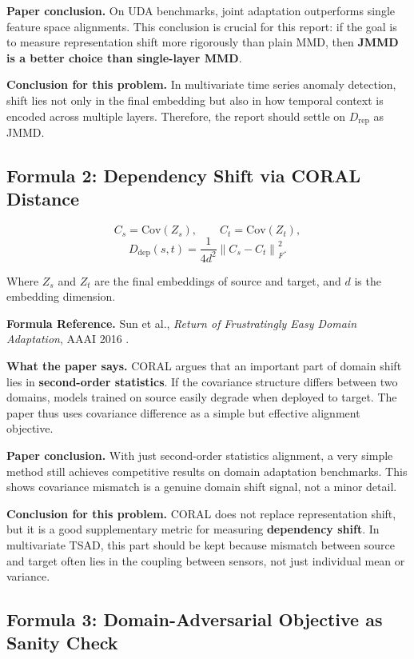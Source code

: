 \documentclass[a4paper]{article}
\begin{document}
\textbf{Paper conclusion.} On UDA benchmarks, joint adaptation outperforms single feature space alignments. This conclusion is crucial for this report: if the goal is to measure representation shift more rigorously than plain MMD, then \textbf{JMMD is a better choice than single-layer MMD}.

\textbf{Conclusion for this problem.} In multivariate time series anomaly detection, shift lies not only in the final embedding but also in how temporal context is encoded across multiple layers. Therefore, the report should settle on \(D_{\mathrm{rep}}\) as JMMD.

\subsection{Formula 2: Dependency Shift via CORAL Distance}

\[
C_s = \mathrm{Cov}(Z_s),
\qquad
C_t = \mathrm{Cov}(Z_t),
\]
\[
D_{\mathrm{dep}}(s,t) = \frac{1}{4d^2}\left\| C_s - C_t \right\|_F^2.
\]

Where \(Z_s\) and \(Z_t\) are the final embeddings of source and target, and \(d\) is the embedding dimension.

\textbf{Formula Reference.} Sun et al., \emph{Return of Frustratingly Easy Domain Adaptation}, AAAI 2016 \cite{coral}.

\textbf{What the paper says.} CORAL argues that an important part of domain shift lies in \textbf{second-order statistics}. If the covariance structure differs between two domains, models trained on source easily degrade when deployed to target. The paper thus uses covariance difference as a simple but effective alignment objective.

\textbf{Paper conclusion.} With just second-order statistics alignment, a very simple method still achieves competitive results on domain adaptation benchmarks. This shows covariance mismatch is a genuine domain shift signal, not a minor detail.

\textbf{Conclusion for this problem.} CORAL does not replace representation shift, but it is a good supplementary metric for measuring \textbf{dependency shift}. In multivariate TSAD, this part should be kept because mismatch between source and target often lies in the coupling between sensors, not just individual mean or variance.

\subsection{Formula 3: Domain-Adversarial Objective as Sanity Check}
\end{document}
